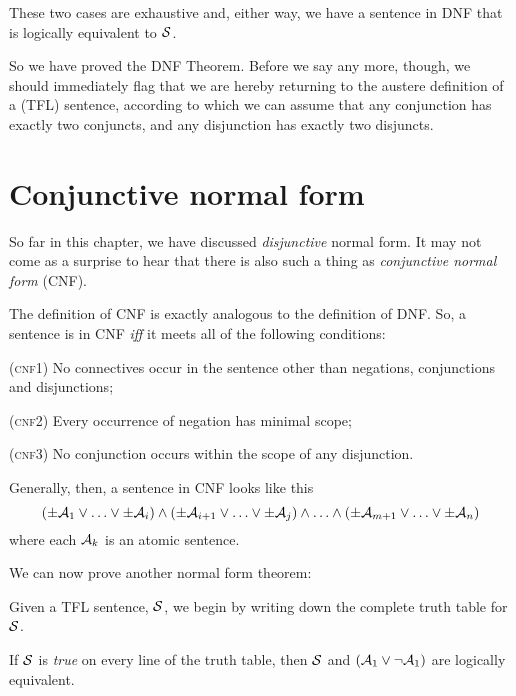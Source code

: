 	These two cases are exhaustive and, either way, we have a sentence in DNF that is logically equivalent to $\mathcal{S}$.

So we have proved the DNF Theorem. Before we say any more, though, we should immediately flag that we are hereby returning to the austere definition of a (TFL) sentence, according to which we can assume that any conjunction has exactly two conjuncts, and any disjunction has exactly two disjuncts.


\section{Conjunctive normal form}
\label{s:CNF}

So far in this chapter, we have discussed \emph{disjunctive} normal form. It may not come as a surprise to hear that there is also such a thing as \emph{conjunctive normal form} (CNF).

The definition of CNF is exactly analogous to the definition of DNF. So, a sentence is in CNF \emph{iff} it meets all of the following conditions:
	\begin{earg}
		\item[(\textsc{cnf1})] No connectives occur in the sentence other than negations, conjunctions and disjunctions;
		\item[(\textsc{cnf2})] Every occurrence of negation has minimal scope;
		\item[(\textsc{cnf3})] No conjunction occurs within the scope of any disjunction. 
	\end{earg}
Generally, then, a sentence in CNF looks like this
	$$(\pm \mathcal{A}_1 \lor \ldots \lor \pm \mathcal{A}_i) \land (\pm \mathcal{A}_{i+1} \lor \ldots \lor \pm\mathcal{A}_j) \land \ldots \land (\pm\mathcal{A}_{m+1} \lor\ldots \lor \pm \mathcal{A}_n)$$
where each $\mathcal{A}_k$ is an atomic sentence.

We can now prove another normal form theorem:

        
	Given a TFL sentence, $\mathcal{S}$, we begin by writing down the complete truth table for $\mathcal{S}$.
	
	If $\mathcal{S}$ is \emph{true} on every line of the truth table, then $\mathcal{S}$ and $(\mathcal{A}_1 \vee \neg \mathcal{A}_1)$ are logically equivalent.
	
